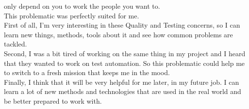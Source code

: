 only depend on you to work the people you want to. \\
\newline
This problematic was perfectly suited for me. \\
First of all, I'm very interesting in these Quality and Testing concerns,
so I can learn new things, methods, tools about it and see how common
problems are tackled. \\
Second, I was a bit tired of working on the same thing in my project and
I heard that they wanted to work on test automation.
So this problematic could help me to switch to a fresh mission that keeps me
in the mood. \\
Finally, I think that it will be very helpful for me later, in my future
job.
I can learn a lot of new methods and technologies that are used in the real
world and be better prepared to work with.
